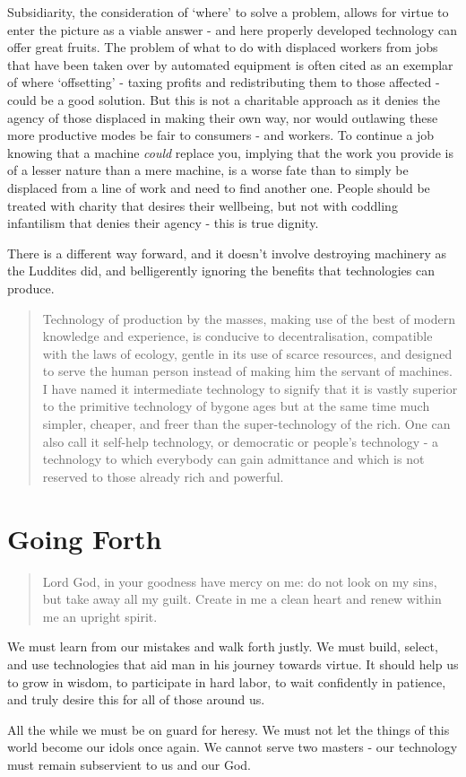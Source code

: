 \documentclass[letterpaper]{article}
\begin{document}
Subsidiarity, the consideration of `where' to solve a problem, allows for virtue to enter the picture as a viable answer - and here properly developed technology can offer great fruits. The problem of what to do with displaced workers from jobs that have been taken over by automated equipment is often cited as an exemplar of where `offsetting' - taxing profits and redistributing them to those affected - could be a good solution. But this is not a charitable approach as it denies the agency of those displaced in making their own way, nor would outlawing these more productive modes be fair to consumers - and workers. To continue a job knowing that a machine \textit{could} replace you, implying that the work you provide is of a lesser nature than a mere machine, is a worse fate than to simply be displaced from a line of work and need to find another one. People should be treated with charity that desires their wellbeing, but not with coddling infantilism that denies their agency - this is true dignity.

There is a different way forward, and it doesn't involve destroying machinery as the Luddites did, and belligerently ignoring the benefits that technologies can produce.

\begin{quote}
  Technology of production by the masses, making use of the best of modern knowledge and experience, is conducive to decentralisation, compatible with the laws of ecology, gentle in its use of scarce resources, and designed to serve the human person instead of making him the servant of machines. I have named it intermediate technology to signify that it is vastly superior to the primitive technology of bygone ages but at the same time much simpler, cheaper, and freer than the super-technology of the rich. One can also call it self-help technology, or democratic or people's technology - a technology to which everybody can gain admittance and which is not reserved to those already rich and powerful.
\end{quote}

\section{Going Forth}

\begin{quote}
  Lord God, in your goodness have mercy on me: do not look on my sins, but take away all my guilt. Create in me a clean heart and renew within me an upright spirit.
\end{quote}

We must learn from our mistakes and walk forth justly. We must build, select, and use technologies that aid man in his journey towards virtue. It should help us to grow in wisdom, to participate in hard labor, to wait confidently in patience, and truly desire this for all of those around us.

All the while we must be on guard for heresy. We must not let the things of this world become our idols once again. We cannot serve two masters - our technology must remain subservient to us and our God.
\end{document}
